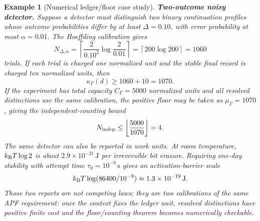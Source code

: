\documentclass[11pt]{article}
\newtheorem{example}[theorem]{Example}
\begin{document}
\begin{example}[Numerical ledger/floor case study]\label{ex:numerical-kappa-case-study}
\textbf{Two-outcome noisy detector.}
Suppose a detector must distinguish two binary continuation profiles whose outcome probabilities differ by at least \(\Delta=0.10\), with error probability at most \(\alpha=0.01\).  The Hoeffding calibration gives
\[
  N_{\Delta,\alpha}
  =\left\lceil \frac{2}{0.10^2}\log \frac{2}{0.01}\right\rceil
  =\left\lceil 200\log 200\right\rceil
  =1060
\]
trials.  If each trial is charged one normalized unit and the stable final record is charged ten normalized units, then
\[
  \kappa_\Gamma(d)\ge 1060+10=1070.
\]
If the experiment has total capacity \(C_\Gamma=5000\) normalized units and all resolved distinctions use the same calibration, the positive floor may be taken as \(\mu_\Gamma=1070\), giving the independent-counting bound
\[
  N_{\rm indep}\le \left\lfloor \frac{5000}{1070}\right\rfloor=4 .
\]
The same detector can also be reported in work units.  At room temperature, \(k_{\rm B}T\log2\) is about \(2.9\times10^{-21}\,\mathrm J\) per irreversible bit erasure.  Requiring one-day stability with attempt time \(\tau_0=10^{-9}\,\mathrm s\) gives an activation-barrier scale
\[
  k_{\rm B}T\log(86400/10^{-9})\approx 1.3\times10^{-19}\,\mathrm J.
\]
Those two reports are not competing laws; they are two calibrations of the same APF requirement: once the context fixes the ledger unit, resolved distinctions have positive finite cost and the floor/counting theorem becomes numerically checkable.
\end{example}
\end{document}
